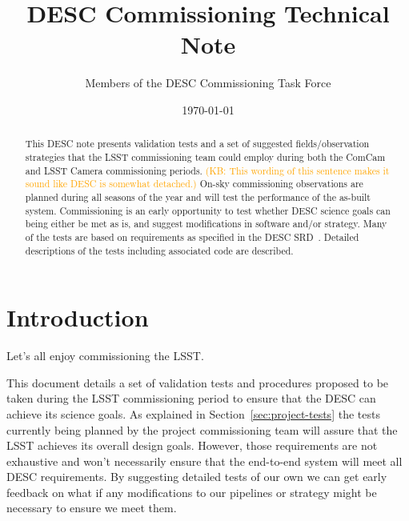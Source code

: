 \documentclass[modern]{desc-tex/styles/lsstdescnote}
\newcommand{\KB}[1]{{\textcolor{orange}{(KB: #1)}}}
\begin{document}
\title{DESC Commissioning Technical Note}
\author{Members of the DESC Commissioning Task Force}
\date{\today}

\begin{abstract}

  This DESC note presents validation tests and a set of suggested fields/observation strategies that the LSST commissioning team could employ during both the ComCam and LSST Camera commissioning periods. 
  \KB{This wording of this sentence makes it sound like DESC is somewhat detached.}
  On-sky commissioning observations are planned during all seasons of the year and will test the performance of the as-built system. 
  Commissioning is an early opportunity to test whether DESC science goals can being either be met as is, and suggest modifications in software and/or strategy.  Many of the tests are based on requirements as specified in the DESC SRD~\cite{DESC-SRD}.  Detailed descriptions of the tests including associated code are described.  
  
 \end{abstract}

\maketitle

\noindent
\begin{center}
  \fboxsep=5pt  
 \end{center} 
\vspace{0.1in}

\section{Introduction}

Let's all enjoy commissioning the LSST.

This document details a set of validation tests and procedures proposed to be taken during the LSST commissioning period to ensure that the DESC can achieve its science goals.  As explained in Section~\ref{sec:project-tests} the tests currently being planned by the project commissioning team will assure that the LSST achieves its overall design goals. However, those requirements are not exhaustive and won't necessarily ensure that the end-to-end system will meet all DESC requirements.  By suggesting detailed tests of our own we can get early feedback on what if any modifications to our pipelines or strategy might be necessary to ensure we meet them.
\end{document}
